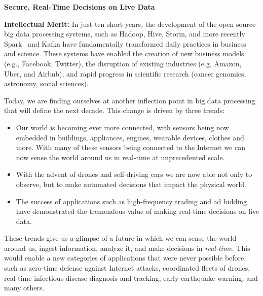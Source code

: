 \documentclass [10pt]{article}
\begin{document}
\pagestyle{empty}



\newpage


\begin{center}
{\Large {\bf Secure, Real-Time Decisions on Live Data}}
\end{center}

{%
{}
{\bf Intellectual Merit:}  In just ten short years, the development of the open source big data processing systems, such as Hadoop, Hive, Storm, and more recently Spark~\cite{spark} and Kafka have fundamentally transformed daily practices in business and science. These systems have enabled the creation of new business models (e.g., Facebook, Twitter), the disruption of existing industries (e.g, Amazon, Uber, and Airbnb), and rapid progress in scientific research (cancer genomics, astronomy, social sciences). 

Today, we are finding ourselves at another inflection point in big data processing that will define the next decade. This change is driven by three trends:

\begin{itemize}[noitemsep,topsep=0pt,parsep=0pt,partopsep=0pt]
\item Our world is becoming ever more connected, with sensors being now embedded in buildings, appliances, engines, wearable devices, clothes and more. With many of these sensors being connected to the Internet we can now sense the world around us in real-time at unprecedented scale.
\item With the advent of drones and self-driving cars we are now able not only to observe, but to make automated decisions that impact the physical world.
\item The success of applications such as high-frequency trading and ad bidding have demonstrated the tremendous value of making real-time decisions on live data.
\end{itemize}

These trends give us a glimpse of a future in which we can sense the world around us, ingest information, analyze it, and make decisions in \emph{real-time}.  
This would enable a new categories of applications that were never possible before, such as zero-time defense against Internet attacks, coordinated fleets of drones, real-time infectious disease diagnosis and tracking, early earthquake warning, and many others.

}
\end{document}
